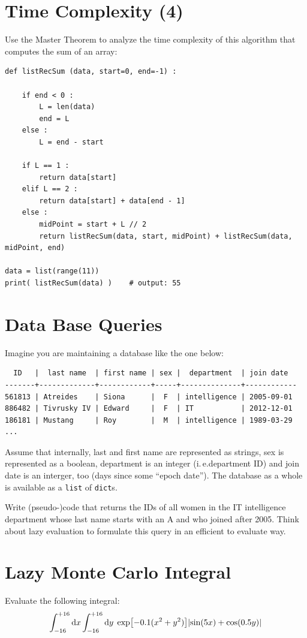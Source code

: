 \documentclass[
	english,
	fontsize=10pt,
	parskip=half,
	titlepage=true,
	DIV=12
]{scrartcl}
\newcommand*{\inPy}[1]{\texttt{#1}}
\newcommand*{\ie}{i.\,e.}
\begin{document}
\section{Time Complexity (4)}
Use the Master Theorem to analyze the time complexity of this algorithm that computes the sum of an array:
\begin{verbatim}
def listRecSum (data, start=0, end=-1) :
    
    if end < 0 : 
        L = len(data)
        end = L
    else :
        L = end - start
    
    if L == 1 :
        return data[start]
    elif L == 2 :
        return data[start] + data[end - 1]
    else :
        midPoint = start + L // 2
        return listRecSum(data, start, midPoint) + listRecSum(data, midPoint, end)

data = list(range(11))
print( listRecSum(data) )    # output: 55
\end{verbatim}

\section{Data Base Queries}
Imagine you are maintaining a database like the one below:
\begin{verbatim}
  ID   |  last name  | first name | sex |  department  | join date
-------+-------------+------------+-----+--------------+------------
561813 | Atreides    | Siona      |  F  | intelligence | 2005-09-01
886482 | Tivrusky IV | Edward     |  F  | IT           | 2012-12-01
186181 | Mustang     | Roy        |  M  | intelligence | 1989-03-29
...
\end{verbatim}

Assume that internally, last and first name are represented as strings, sex is represented as a boolean, department is an integer (\ie department ID) and join date is an interger, too (days since some \enquote{epoch date}). The database as a whole is available as a \inPy{list} of \inPy{dict}s.

Write (pseudo-)code that returns the IDs of all women in the IT intelligence department whose last name starts with an A and who joined after 2005. Think about lazy evaluation to formulate this query in an efficient to evaluate way.

\section{Lazy Monte Carlo Integral}
Evaluate the following integral:
\[
	\int_{-16}^{+16} \dd{x}
	\int_{-16}^{+16} \dd{y} \;
		\exp[-0.1 (x^2 + y^2)]
		\qty|
			\sin(5 x) + \cos(0.5 y)
		|
\]
\end{document}
